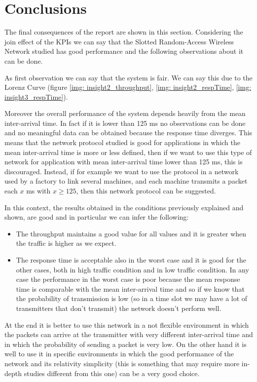 \section{Conclusions}
The final consequences of the report are shown in this section. Considering the join effect of the KPIs we can say that the Slotted Random-Access Wireless Network studied has good performance and the following observations about it can be done. 

\noindent As first observation we can say that the system is fair. We can say this due to the Lorenz Curve (figure \ref{img: insight2_throughput}, \ref{img: insight2_respTime}, \ref{img: insight3_respTime}).

\noindent Moreover the overall performance of the system depends heavily from the mean inter-arrival time. In fact if it is lower than 125 ms no observations can be done and no meaningful data can be obtained because the response time diverges. This means that the network protocol studied is good for applications in which the mean inter-arrival time is more or less defined, then if we want to use this type of network for application with mean inter-arrival time lower than 125 ms, this is discouraged. Instead, if for example we want to use the protocol in a network used by a factory to link several machines, and each machine transmits a packet each $x$ ms with $x\ge125$, then this network protocol can be suggested.

\noindent In this context, the results obtained in the conditions previously explained and shown, are good and in particular we can infer the following:
\begin{itemize}
	\item The throughput maintains a good value for all values and it is greater when the traffic is higher as we expect.
	
	\item The response time is acceptable also in the worst case and it is good for the other cases, both in high traffic condition and in low traffic condition. In any case the performance in the worst case is poor because the mean response time is comparable with the mean inter-arrival time and so if we know that the probability of transmission is low (so in a time slot we may have a lot of transmitters that don't transmit) the network doesn't perform well.
\end{itemize}

\noindent At the end it is better to use this network in a not flexible environment in which the packets can arrive at the transmitter with very different inter-arrival time and in which the probability of sending a packet is very low. On the other hand it is well to use it in specific environments in which the good performance of the network and its relativity simplicity (this is something that may require more in-depth studies different from this one) can be a very good choice. 